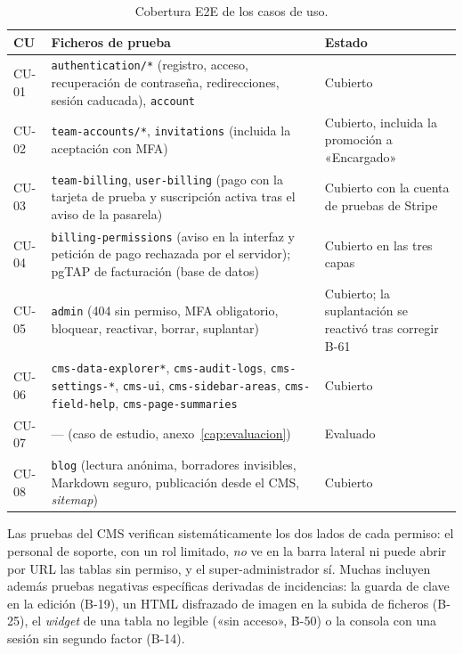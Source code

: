 \begin{table}[htbp]
  \centering
  \footnotesize
  \caption{Cobertura E2E de los casos de uso.}
  \label{tab:pru-cu}
  \begin{tabularx}{\textwidth}{@{}l>{\raggedright\arraybackslash}p{5.0cm}>{\raggedright\arraybackslash}X@{}}
    \toprule
    \textbf{CU} & \textbf{Ficheros de prueba} & \textbf{Estado} \\
    \midrule
    CU-01 & \texttt{authentication/*} (registro, acceso, recuperación de contraseña, redirecciones, sesión caducada), \texttt{account} & Cubierto \\
    CU-02 & \texttt{team-accounts/*}, \texttt{invitations} (incluida la aceptación con MFA) & Cubierto, incluida la promoción a «Encargado» \\
    CU-03 & \texttt{team-billing}, \texttt{user-billing} (pago con la tarjeta de prueba y suscripción activa tras el aviso de la pasarela) & Cubierto con la cuenta de pruebas de Stripe \\
    CU-04 & \texttt{billing-permissions} (aviso en la interfaz y petición de pago rechazada por el servidor); pgTAP de facturación (base de datos) & Cubierto en las tres capas \\
    CU-05 & \texttt{admin} (404 sin permiso, MFA obligatorio, bloquear, reactivar, borrar, suplantar) & Cubierto; la suplantación se reactivó tras corregir B-61 \\
    CU-06 & \texttt{cms-data-explorer*}, \texttt{cms-audit-logs}, \texttt{cms-settings-*}, \texttt{cms-ui}, \texttt{cms-sidebar-areas}, \texttt{cms-field-help}, \texttt{cms-page-summaries} & Cubierto \\
    CU-07 & --- (caso de estudio, anexo~\ref{cap:evaluacion}) & Evaluado \\
    CU-08 & \texttt{blog} (lectura anónima, borradores invisibles, Markdown seguro, publicación desde el CMS, \textit{sitemap}) & Cubierto \\
    \bottomrule
  \end{tabularx}
\end{table}

Las pruebas del CMS verifican sistemáticamente los dos lados de cada
permiso: el personal de soporte, con un rol limitado, \emph{no} ve en la
barra lateral ni puede abrir por URL las tablas sin permiso, y el
super-administrador sí. Muchas incluyen además pruebas negativas
específicas derivadas de incidencias: la guarda de clave en la edición
(B-19), un HTML disfrazado de imagen en la subida de ficheros (B-25), el
\textit{widget} de una tabla no legible («sin acceso», B-50) o la consola con
una sesión sin segundo factor (B-14).

